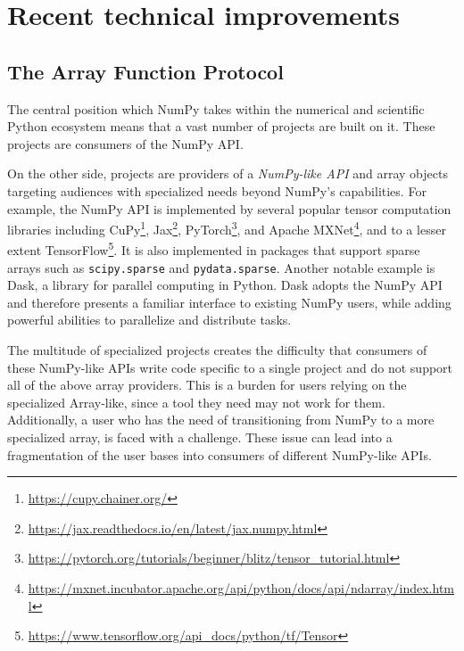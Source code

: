 \documentclass[fleqn,10pt]{wlscirep}
\newcommand{\code}[1]{\texttt{#1}}
\begin{document}
\section*{Recent technical improvements}




\subsection*{The Array Function Protocol}

The central position which NumPy takes within the numerical and scientific
Python ecosystem  means that a vast number of projects are built on it.
These projects are consumers of the NumPy API.

On the other side, projects are providers of a \emph{NumPy-like API} and array
objects targeting audiences with specialized needs beyond NumPy's capabilities.
For example, the NumPy API is implemented by
several popular tensor computation libraries including
CuPy\footnote{\url{https://cupy.chainer.org/}},
Jax\footnote{\url{https://jax.readthedocs.io/en/latest/jax.numpy.html}},
PyTorch\footnote{\url{https://pytorch.org/tutorials/beginner/blitz/tensor\_tutorial.html}}, and
Apache MXNet\footnote{\url{https://mxnet.incubator.apache.org/api/python/docs/api/ndarray/index.html}},
and to a lesser extent
TensorFlow\footnote{\url{https://www.tensorflow.org/api\_docs/python/tf/Tensor}}.
It is also implemented in packages that support sparse arrays
such as \code{scipy.sparse} and \code{pydata.sparse}.
Another notable example is Dask, a library for parallel computing in
Python.  Dask adopts the NumPy API and therefore presents a familiar
interface to existing NumPy users, while adding powerful abilities to
parallelize and distribute tasks.

The multitude of specialized projects creates the difficulty that consumers
of these NumPy-like APIs write code specific to a single project and do not support
all of the above array providers.
This is a burden for users relying on the specialized Array-like, since
a tool they need may not work for them.
Additionally, a user who has the need of transitioning from NumPy to a more
specialized array, is faced with a challenge.
These issue can lead into a fragmentation of the user bases into consumers
of different NumPy-like APIs.
\end{document}
